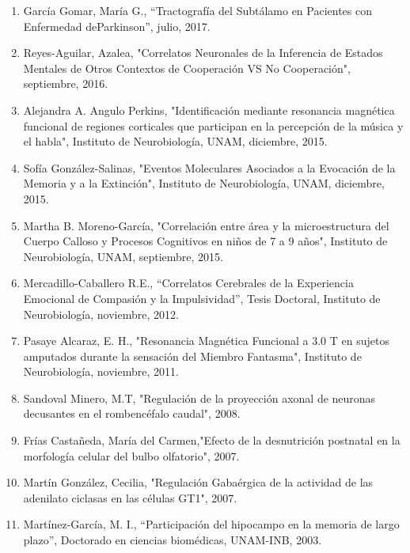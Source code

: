 \begin{enumerate}
\item García Gomar, María G., “Tractografía del Subtálamo en Pacientes con Enfermedad deParkinson”, julio, 2017.

\item Reyes-Aguilar, Azalea, "Correlatos Neuronales de la Inferencia de Estados Mentales de Otros Contextos de Cooperación VS No Cooperación",  
septiembre, 2016.

\item Alejandra A. Angulo Perkins, "Identificación mediante resonancia magnética funcional de regiones corticales que participan en la percepción de la 
música y 
el habla", Instituto de Neurobiología, UNAM, diciembre, 2015.

\item Sofía González-Salinas, "Eventos Moleculares Asociados a la Evocación de la Memoria y a la Extinción", Instituto de Neurobiología, UNAM, diciembre, 2015.

\item Martha B. Moreno-García, "Correlación entre área y la microestructura del Cuerpo Calloso y Procesos Cognitivos en niños de 7 a 9 años", Instituto de 
Neurobiología, UNAM, septiembre, 2015.

\item Mercadillo-Caballero R.E., “Correlatos Cerebrales de la Experiencia Emocional de Compasión y la Impulsividad”, Tesis Doctoral, Instituto de 
Neurobiología, noviembre, 2012.

\item Pasaye Alcaraz, E. H., "Resonancia Magnética Funcional a 3.0 T en sujetos amputados durante la sensación del Miembro Fantasma", Instituto de 
Neurobiología, noviembre, 2011.

\item Sandoval Minero, M.T, "Regulación de la proyección axonal de neuronas decusantes en el rombencéfalo caudal",  2008.

\item Frías Castañeda, María del Carmen,"Efecto de la desnutrición postnatal en la morfología celular del bulbo olfatorio",  2007.

\item Martín González, Cecilia, "Regulación Gabaérgica de la actividad de las adenilato ciclasas en las células GT1",  2007.

\item Martínez-García, M. I., “Participación del hipocampo en la memoria de largo plazo”, Doctorado en ciencias biomédicas, UNAM-INB,  2003.

\end{enumerate}

